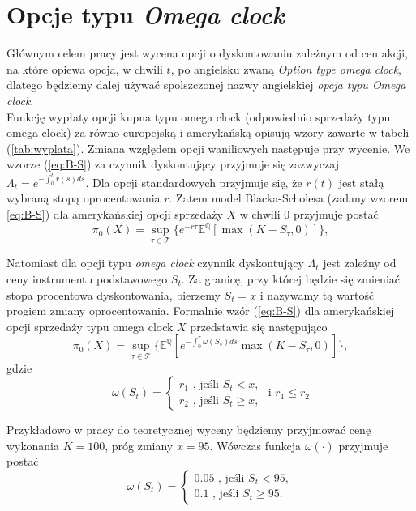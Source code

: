 \documentclass[]{pwr_wmat_praca_dyplomowa}
\theoremstyle{plain}
\numberwithin{theorem}{chapter}
\theoremstyle{definition}
\numberwithin{theorem}{chapter}
\begin{document}
\chapter{Opcje typu \textit{Omega clock}}
\label{opcje}
Głównym celem pracy jest wycena opcji o dyskontowaniu zależnym od cen akcji, na które opiewa opcja, w chwili $t$, po angielsku zwaną \textit{Option type omega clock}, dlatego będziemy dalej używać spolszczonej nazwy angielskiej \textit{opcja typu Omega clock}. \\

Funkcję wypłaty opcji kupna typu omega clock (odpowiednio sprzedaży typu omega clock) za równo europejską i amerykańską opisują wzory zawarte w tabeli (\ref{tab:wyplata}).
Zmiana względem opcji waniliowych następuje przy wycenie. We wzorze (\ref{eq:B-S}) za czynnik dyskontujący przyjmuje się zazwyczaj $\Lambda_t = e^{-\int_0^tr(s)ds}$. Dla opcji standardowych przyjmuje się, że $r(t)$ jest stałą wybraną stopą oprocentowania $r$. Zatem model Blacka-Scholesa (zadany wzorem \ref{eq:B-S}) dla amerykańskiej opcji sprzedaży $X$ w chwili $0$ przyjmuje postać
\begin{equation*}
\pi_0(X) = \sup_{\tau \in \mathcal{T}} \{e^{-r\tau} \mathbb{E}^{\mathbb{Q}}[\max(K-S_{\tau},0)]\},
\end{equation*}

Natomiast dla opcji typu \textit{omega clock} czynnik dyskontujący $\Lambda_t$ jest zależny od ceny instrumentu podstawowego $S_t$. Za granicę, przy której będzie się zmieniać stopa procentowa dyskontowania, bierzemy $S_t = x$ i nazywamy tą wartość progiem zmiany oprocentowania. Formalnie wzór (\ref{eq:B-S}) dla amerykańskiej opcji sprzedaży typu omega clock $X$ przedstawia się następująco
\begin{equation}
\label{eq:B-S_omega}
\pi_0(X) = \sup_{\tau \in \mathcal{T}}\{ \mathbb{E}^{\mathbb{Q}} [e^{-\int_0^{\tau} \omega(S_s)ds} \max(K-S_{\tau},0)] \},
\end{equation}
gdzie
\begin{equation}
\label{eq:omega}
\omega(S_t)=  \left\{ \begin{array}{ll}
r_1 \textrm{ , jeśli }S_t < x,\\
r_2 \textrm { , jeśli }S_t \geq x,
\end{array} \right.
\textrm{ i } r_1\leq r_2
\end{equation}

\noindent Przykładowo w pracy do teoretycznej wyceny będziemy przyjmować cenę wykonania $K=100$, próg zmiany $x = 95$. Wówczas funkcja $\omega(\cdot)$ przyjmuje postać
\begin{equation}
\label{eq:r}
\omega(S_t)=  \left\{ \begin{array}{ll}
0.05 \textrm{ , jeśli }S_t <95,\\
0.1 \textrm { , jeśli }S_t \geq 95.
\end{array} \right.
\end{equation}
\end{document}
